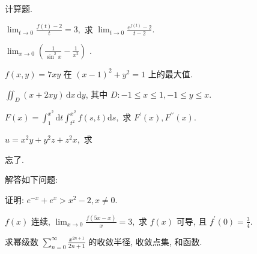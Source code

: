 \par{}
计算题.\par
$\lim_{t\to 0}\frac{f(t) - 2}{t} = 3,$ 求 $\lim_{t\to 0}\frac{e^{f(t)} - 2}{t - 2}.$\par
$\lim_{x\to0}\left(\frac{1}{\sin^{2}x}-\frac{1}{x^{2}}\right)$ .\par
$f(x,y) = 7xy$ 在 $(x - 1)^2 +y^2 = 1$ 上的最大值.\par
$\iint_{D} (x + 2xy) \, \mathrm{d}x \, \mathrm{d}y$, 其中 $D: -1 \leq x \leq 1, -1 \leq y \leq x$.\par
$F(x) = \int_{1}^{x^2}\mathrm{d}t\int_{t^2}^{x^2}f(s,t)\mathrm{d}s,$ 求 $F^{\prime}(x),F^{\prime \prime}(x).$\par
$u = x^{2}y + y^{2}z + z^{2}x,$ 求 \par
忘了.\par
\par{}
解答如下问题:\par
证明: $e^{-x} + e^{x} > x^{2} - 2, x \neq 0$.\par
$f(x)$ 连续, $\lim_{x\to 0}\frac{f(5x - x)}{x} = 3,$ 求 $f(x)$ 可导, 且 $f^{\prime}(0) = \frac{3}{4}$.\par
\par{}
求幂级数 $\sum_{n=0}^{\infty} \frac{x^{2n+1}}{2n+1}$ 的收敛半径, 收敛点集, 和函数.\par

